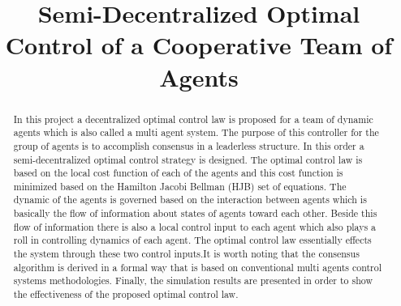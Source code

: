 \documentclass[conference]{IEEEtran}
\begin{document}
\title{Semi-Decentralized Optimal Control of a Cooperative Team of Agents}


\author{
}

\maketitle


\begin{abstract}
In this project a decentralized optimal control law is proposed for a team of dynamic agents which is also called a multi agent system. The purpose of this controller for the group of agents is to accomplish consensus in a leaderless structure. In this order a semi-decentralized optimal control strategy is designed. The optimal control law is based on the local cost function of each of the agents and this cost function is minimized based on the Hamilton Jacobi Bellman (HJB) set of equations. The dynamic of the agents is governed based on the interaction between agents which is basically the flow of information about states of agents toward each other. Beside this flow of information there is also a local control input to each agent which also plays a roll in controlling dynamics of each agent. The optimal control law essentially effects the system through these two control inputs.It is worth noting that the consensus algorithm is derived in a formal way that is based on conventional multi agents control systems methodologies. Finally, the simulation results are presented in order to show the effectiveness of the proposed optimal control law.
\end{abstract}

\IEEEpeerreviewmaketitle
\end{document}
